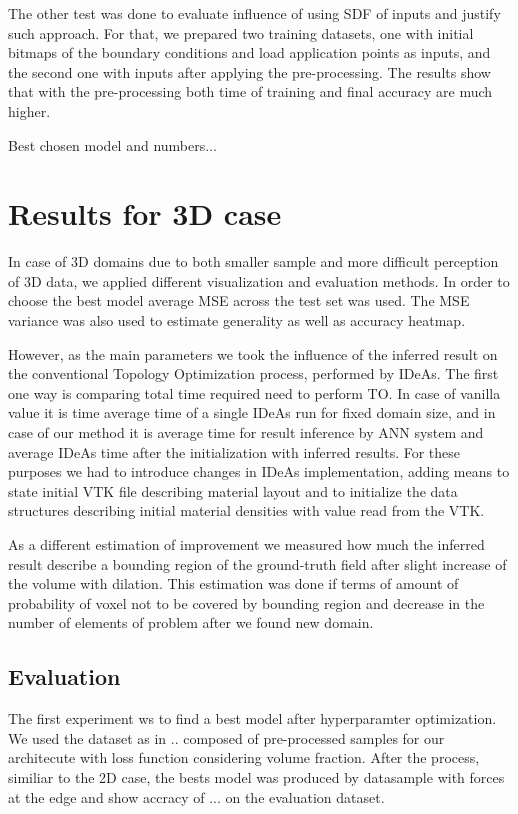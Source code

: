 The other test was done to evaluate influence of using SDF of inputs and justify such approach.
For that, we prepared two training datasets, one with initial bitmaps of the boundary conditions and load application points as inputs, and the second one with inputs after applying the pre-processing.
The results show that with the pre-processing both time of training and final accuracy are much higher.
\medskip

Best chosen model and numbers...

\section{Results for 3D case}

In case of 3D domains due to both smaller sample and more difficult perception of 3D data, we applied different visualization and evaluation methods.
In order to choose the best model average MSE across the test set was used.
The MSE variance was also used to estimate generality as well as accuracy heatmap.

However, as the main parameters we took the influence of the inferred result on the conventional Topology Optimization process, performed by IDeAs.
The first one way is comparing total time required need to perform TO. 
In case of vanilla value it is time average time of a single IDeAs run for fixed domain size, and in case of our method it is average time for result inference by ANN system and average IDeAs time after the initialization with inferred results. For these purposes we had to introduce changes in IDeAs implementation, adding means to state initial VTK file describing material layout and to initialize the data structures describing initial material densities with value read from the VTK.

As a different estimation of improvement we measured how much the inferred result describe a bounding region of the ground-truth field after slight increase of the volume with dilation.
This estimation was done if terms of amount of probability of voxel not to be covered by bounding region and decrease in the number of elements of problem  after we found new domain. 

\subsection{Evaluation}

The first experiment ws to find a best model after hyperparamter optimization.
We used the dataset as in .. composed of pre-processed samples for our architecute with loss function considering volume fraction.
After the process, similiar to the 2D case, the bests model was produced by datasample with forces at the edge and show accracy of ... on the evaluation dataset. 

